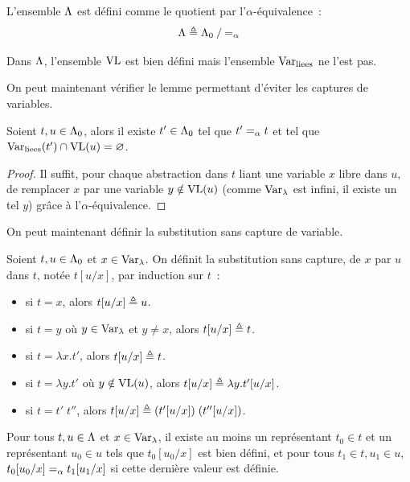 \begin{definition}
  L'ensemble $\lamSet$ est défini comme le quotient par l'$\alpha$-équivalence~:
  \[\Lambda \triangleq \mathord{\Lambda_0}\mathbin{/}\mathord{=_{\alpha}}\]
  \index[notation]{$\lamSet$}
\end{definition}

\begin{remark}
  Dans $\lamSet$, l'ensemble $\operatorname{VL}$ est bien défini mais l'ensemble $\operatorname{Var}_{\mathrm{liees}}$ ne
  l'est pas.
\end{remark}

On peut maintenant vérifier le lemme permettant d'éviter les captures de
variables.

\begin{lemma}
  Soient $t,u \in \Lambda_0$, alors il existe $t' \in \Lambda_0$ tel que
  $t' =_{\alpha} t$ et tel que $\operatorname{Var}_{\mathrm{liees}}(t') \cap \operatorname{VL}(u) =\varnothing$.
\end{lemma}

\begin{proof}
  Il suffit, pour chaque abstraction dans $t$ liant une variable $x$ libre dans
  $u$, de remplacer $x$ par une variable $y \notin\operatorname{VL}(u)$ (comme $\operatorname{Var}_{\lambda}$
  est infini, il existe un tel $y$) grâce à l'$\alpha$-équivalence.
\end{proof}

On peut maintenant définir la substitution sans capture de variable.

\begin{definition}
  Soient $t,u\in\Lambda_0$ et $x \in \operatorname{Var}_{\lambda}$. On définit la substitution sans
  capture, de $x$ par $u$ dans $t$, notée $t[u/x]$, par induction sur $t$~:
  \begin{itemize}
  \item si $t = x$, alors $t[u/x] \triangleq u$.
  \item si $t = y$ où $y \in \operatorname{Var}_{\lambda}$ et $y \neq x$, alors $t[u/x] \triangleq t$.
  \item si $t = \lambda x.t'$, alors $t[u/x] \triangleq t$.
  \item si $t = \lambda y.t'$ où $y \notin \operatorname{VL}(u)$, alors
    $t[u/x] \triangleq \lambda y.t'[u/x]$.
  \item si $t = t'\;t''$, alors $t[u/x] \triangleq (t'[u/x])\;(t''[u/x])$.
  \end{itemize}
\end{definition}

\begin{proposition}
  Pour tous $t,u \in \Lambda$ et $x \in \operatorname{Var}_{\lambda}$, il existe au moins un
  représentant $t_0 \in t$ et un représentant $u_0 \in u$ tels que
  $t_0[u_0/x]$ est bien défini, et pour tous $t_1\in t, u_1\in u$,
  $t_0[u_0/x] =_{\alpha} t_1[u_1/x]$ si cette dernière valeur est définie.
\end{proposition}

